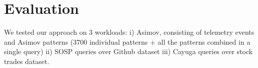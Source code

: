 \section{Evaluation}

We tested our approach on 3 workloads:
i) Asimov, consisting of telemetry events and Asimov patterns (3700 individual
patterns + all the patterns combined in a single query)
ii) SOSP queries over Github dataset
iii) Cayuga queries over stock trades dataset.